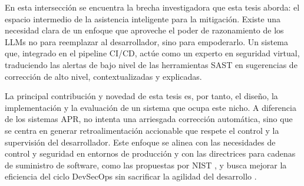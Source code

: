 En esta intersección se encuentra la brecha investigadora que esta tesis aborda: el espacio intermedio de la asistencia inteligente para la mitigación. Existe una necesidad clara de un enfoque que aproveche el poder de razonamiento de los LLMs no para reemplazar al desarrollador, sino para empoderarlo. Un sistema que, integrado en el pipeline CI/CD, actúe como un experto en seguridad virtual, traduciendo las alertas de bajo nivel de las herramientas SAST en sugerencias de corrección de alto nivel, contextualizadas y explicadas.

La principal contribución y novedad de esta tesis es, por tanto, el diseño, la implementación y la evaluación de un sistema que ocupa este nicho. A diferencia de los sistemas APR, no intenta una arriesgada corrección automática, sino que se centra en generar retroalimentación accionable que respete el control y la supervisión del desarrollador. Este enfoque se alinea con las necesidades de control y seguridad en entornos de producción y con las directrices para cadenas de suministro de software, como las propuestas por NIST \cite{NIST2024CICDSecurity}, y busca mejorar la eficiencia del ciclo DevSecOps sin sacrificar la agilidad del desarrollo \cite{Santos2023DevSecOpsReview}.